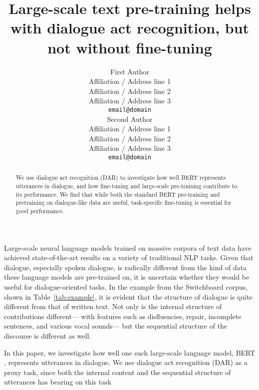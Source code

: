 \documentclass[11pt,a4paper]{article}
\title{Large-scale text pre-training helps with dialogue act recognition, but not without fine-tuning}
\author{First Author \\
  Affiliation / Address line 1 \\
  Affiliation / Address line 2 \\
  Affiliation / Address line 3 \\
  \texttt{email@domain} \\\And
  Second Author \\
  Affiliation / Address line 1 \\
  Affiliation / Address line 2 \\
  Affiliation / Address line 3 \\
  \texttt{email@domain} \\}
\date{}
\begin{document}
\maketitle

\begin{abstract}
  We use dialogue act recognition (DAR)
  to investigate how well BERT represents utterances in dialogue,
  and how fine-tuning and large-scale pre-training contribute to its performance.
  We find that while both the standard BERT pre-training and pretraining on
  dialogue-like data are useful, task-specific fine-tuning is essential for good performance.
\end{abstract}


Large-scale neural language models trained on massive corpora of text data
have achieved state-of-the-art results on a variety of traditional NLP tasks.
Given that dialogue, especially spoken dialogue, 
is radically different from the kind of data these language models are pre-trained on,
it is uncertain whether they would be useful for dialogue-oriented tasks.
In the example from the Switchboard corpus, shown in Table~\ref{tab:example}, 
it is evident that the structure of dialogue is quite different from that of written text.
Not only is the internal structure of contributions different---%
with features such as disfluencies, repair, incomplete sentences, and various vocal sounds---%
but the sequential structure of the discourse is different as well.

In this paper, we investigate how well 
one such large-scale language model,
BERT \citep{devlinBERTPretrainingDeep2018}, 
represents utterances in dialogue.
We use dialogue act recognition (DAR) as a proxy task, 
since both the internal content and the sequential structure of utterances 
has bearing on this task 
\end{document}
